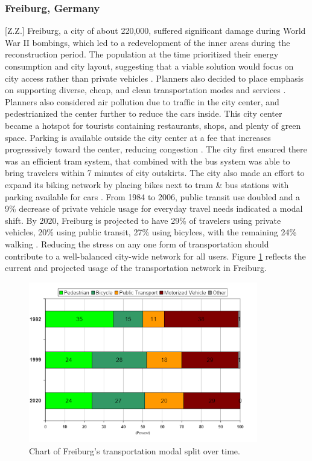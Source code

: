 \documentclass[12pt]{article}                       %
\begin{document}
\subsubsection{Freiburg, Germany}[Z.Z.]
Freiburg, a city of about 220,000, suffered significant damage during World War II bombings, which led to a redevelopment of the inner areas during the reconstruction period. The population at the time prioritized their energy consumption and city layout, suggesting that a viable solution would focus on city access rather than private vehicles \cite{Rydningen2017OsloCentre}. Planners also decided to place emphasis on supporting diverse, cheap, and clean transportation modes and services \cite{Bindra2006SmartGermany}. Planners also considered air pollution due to traffic in the city center, and pedestrianized the center further to reduce the cars inside. This city center became a hotspot for tourists containing restaurants, shops, and plenty of green space. Parking is available outside the city center at a fee that increases progressively toward the center, reducing congestion \cite{Bindra2006SmartGermany}. The city first ensured there was an efficient tram system, that combined with the bus system was able to bring travelers within 7 minutes of city outskirts. The city also made an effort to expand its biking network by placing bikes next to tram \& bus stations with parking available for cars \cite{Bindra2006SmartGermany}. From 1984 to 2006, public transit use doubled and a 9\% decrease of private vehicle usage for everyday travel needs indicated a modal shift. By 2020, Freiburg is projected to have 29\% of travelers using private vehicles, 20\% using public transit, 27\% using bicylces, with the remaining 24\% walking \cite{Rydningen2017OsloCentre}. Reducing the stress on any one form of transportation should contribute to a well-balanced city-wide network for all users. Figure \ref{img:freiburg_modal_split} reflects the current and projected usage of the transportation network in Freiburg.

\begin{figure}[H]
    \centering
    \includegraphics[width=10cm]{images/freiburg_modal_split.png}
    \caption{Chart of Freiburg's transportation modal split over time.}
    \label{img:freiburg_modal_split}
\end{figure}
\end{document}
